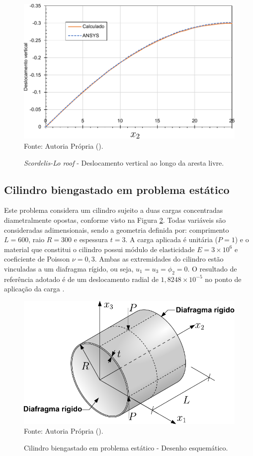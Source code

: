 \begin{figure}[h!]
    \centering
    \caption{\textit{Scordelis-Lo roof} - Deslocamento vertical ao longo da aresta livre.}
    \includegraphics[width=0.6\linewidth]{Figuras/scordelis/deslocamento.pdf}
    \\Fonte: Autoria Própria (\the\year).
    \label{fig:scordelis-graph}
\end{figure}

\subsection{Cilindro biengastado em problema estático} \label{Ap:Shell-cyl}

Este problema considera um cilindro sujeito a duas cargas concentradas diametralmente opostas, conforme visto na Figura \ref{fig:cylinder-shell}. Todas variáveis são consideradas adimensionais, sendo a geometria definida por: comprimento $L=600$, raio $R=300$ e espessura $t=3$. A carga aplicada é unitária ($P=1$) e o material que constitui o cilindro possui módulo de elasticidade $E=3\times10^6$ e coeficiente de Poisson $\nu=0,3$. Ambas as extremidades do cilindro estão vinculadas a um diafragma rígido, ou seja, $u_1=u_3=\phi_2=0$. O resultado de referência adotado é de um deslocamento radial de $1,8248\times10^{-5}$ no ponto de aplicação da carga \cite{BELYTSCHKO1985221,CHAUDINH2023110222,ZHOU2022108568}.

\begin{figure}[h!]
    \centering
    \caption{Cilindro biengastado em problema estático - Desenho esquemático.}
    \includegraphics[width=0.65\linewidth]{Figuras/cylinder-shell/cylinder.pdf}
    \\Fonte: Autoria Própria (\the\year).
    \label{fig:cylinder-shell}
\end{figure}

